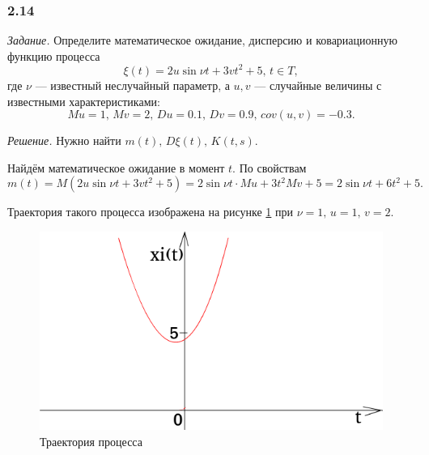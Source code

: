 \subsubsection*{2.14}

\textit{Задание.}
Определите математическое ожидание, дисперсию и ковариационную функцию процесса
$$ \xi \left( t \right) =
  2u \sin \nu t + 3vt^2 + 5, \,
  t \in T,$$
где $ \nu $ --- известный неслучайный параметр, а $u, v$ ---
случайные величины с известными характеристиками:
$$Mu = 1, \,
  Mv = 2, \,
  Du = 0.1, \,
  Dv = 0.9, \,
  cov \left( u, v \right) = -0.3.$$

\textit{Решение.}
Нужно найти $m \left( t \right), \, D \xi \left( t \right), \, K \left( t, s \right) $.

Найдём математическое ожидание в момент $t$.
По свойствам
$$m \left( t \right) =
  M \left( 2u \sin \nu t + 3vt^2 + 5 \right) =
  2 \sin \nu t \cdot Mu + 3t^2 Mv + 5 =
  2 \sin \nu t + 6t^2 + 5.$$

Траектория такого процесса изображена на рисунке \ref{fig:214} при $ \nu = 1, \, u = 1, \, v = 2$.

\begin{figure}[h!]
 \centering
 \includegraphics[width=.5\textwidth]{./pictures/2_14.png}
 \caption{Траектория процесса}
 \label{fig:214}
\end{figure}

